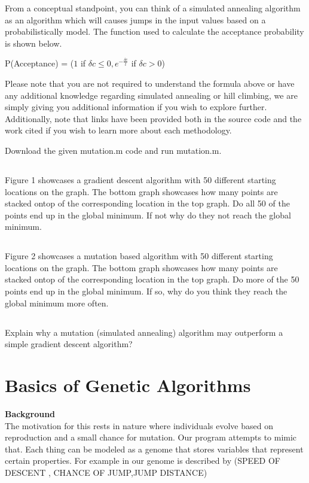\documentclass[12]{extarticle}
\begin{document}
From a conceptual standpoint, you can think of a simulated annealing algorithm as an algorithm which will causes jumps in the input values based on a probabilistically model. The function used to calculate the acceptance probability is shown below\cite{Gnanachandran}.

P(Acceptance) = ($1 $ if $\delta c \leq 0, e^{-\frac{\delta c }{t}} $ if $ \delta c > 0$)

Please note that you are not required to understand the formula above or have any additional knowledge regarding simulated annealing or hill climbing, we are simply giving you additional information if you wish to explore further. Additionally, note that links have been provided both in the source code and the work cited if you wish to learn more about each methodology.



Download the given mutation.m code and run mutation.m.
\subsection{}
Figure 1 showcases a gradient descent algorithm with 50 different starting locations on the graph. The bottom graph showcases how many points are stacked ontop of the corresponding location in the top graph. Do all 50 of the points end up in the global minimum. If not why do they not reach the global minimum.
\subsection{}
Figure 2 showcases a mutation based algorithm with 50 different starting locations on the graph. The bottom graph showcases how many points are stacked ontop of the corresponding location in the top graph. Do more of the 50 points end up in the global minimum. If so, why do you think they reach the global minimum more often.
\subsection{}
Explain why a mutation (simulated annealing) algorithm may outperform a simple gradient descent algorithm?
\section{Basics of Genetic Algorithms}
\textbf{Background} \\

The motivation for this rests in nature where individuals evolve based on reproduction and a small chance for mutation. \cite{CS540} Our program attempts to mimic that. Each thing can be modeled as a genome that stores variables that represent certain properties.  For example in our genome is described by
(SPEED OF DESCENT  ,  CHANCE OF JUMP,JUMP DISTANCE)
\end{document}
